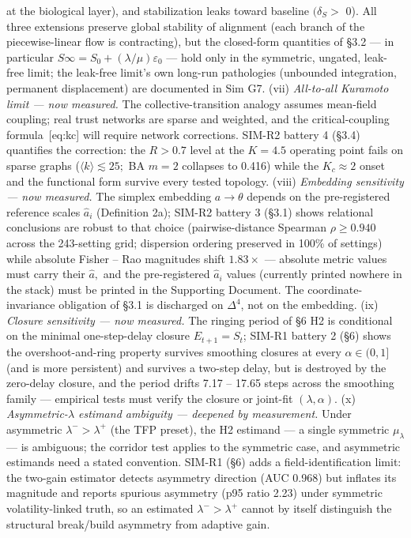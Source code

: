 \documentclass[
]{article}
\begin{document}
at the biological layer), and stabilization leaks toward baseline
\((\delta_S >\) 0). All three extensions preserve global stability of
alignment (each branch of the piecewise-linear flow is contracting), but
the closed-form quantities of §3.2 --- in particular
\(S\infty = S_{0} + (\lambda/\mu)\varepsilon_{0}\) --- hold only in the
symmetric, ungated, leak-free limit; the leak-free limit's own long-run
pathologies (unbounded integration, permanent displacement) are
documented in Sim G7. (vii) \emph{All-to-all Kuramoto limit --- now
measured.} The collective-transition analogy assumes mean-field
coupling; real trust networks are sparse and weighted, and the
critical-coupling formula~{[}eq:kc{]} will require network corrections.
SIM-R2 battery 4 (§3.4) quantifies the correction: the \(R > 0.7\) level
at the \(K = 4.5\) operating point fails on sparse graphs
(\(\langle k\rangle \lesssim 25;\) BA \(m = 2\) collapses to 0.416)
while the \(K_c \approx 2\) onset and the functional form survive every
tested topology. (viii) \emph{Embedding sensitivity --- now measured.}
The simplex embedding \(a \to \theta\) depends on the pre-registered
reference scales \(\hat{a}_i\) (Definition 2a); SIM-R2 battery 3 (§3.1)
shows relational conclusions are robust to that choice
(pairwise-distance Spearman \(\rho \geq 0.940\) across the 243-setting
grid; dispersion ordering preserved in 100\% of settings) while absolute
Fisher -- Rao magnitudes shift \(1.83\times\) --- absolute metric values
must carry their \(\hat{a},\) and the pre-registered \(\hat{a}_i\)
values (currently printed nowhere in the stack) must be printed in the
Supporting Document. The coordinate-invariance obligation of §3.1 is
discharged on \(\Delta^{4}\), not on the embedding. (ix) \emph{Closure
sensitivity --- now measured.} The ringing period of §6 H2 is
conditional on the minimal one-step-delay closure \(E_{t+1} = S_t\);
SIM-R1 battery 2 (§6) shows the overshoot-and-ring property survives
smoothing closures at every \(\alpha \in (0,1]\) (and is more
persistent) and survives a two-step delay, but is destroyed by the
zero-delay closure, and the period drifts 7.17 -- 17.65 steps across the
smoothing family --- empirical tests must verify the closure or
joint-fit \((\lambda, \alpha).\) (x) \emph{Asymmetric-\(\lambda\)
estimand ambiguity --- deepened by measurement.} Under asymmetric
\(\lambda^{-} > \lambda^{+}\) (the TFP preset), the H2 estimand --- a
single symmetric \(\mu_{\lambda}\) --- is ambiguous; the corridor test
applies to the symmetric case, and asymmetric estimands need a stated
convention. SIM-R1 (§6) adds a field-identification limit: the two-gain
estimator detects asymmetry direction (AUC 0.968) but inflates its
magnitude and reports spurious asymmetry (p95 ratio 2.23) under
symmetric volatility-linked truth, so an estimated
\(\lambda^{-} > \lambda^{+}\) cannot by itself distinguish the
structural break/build asymmetry from adaptive gain.
\end{document}
